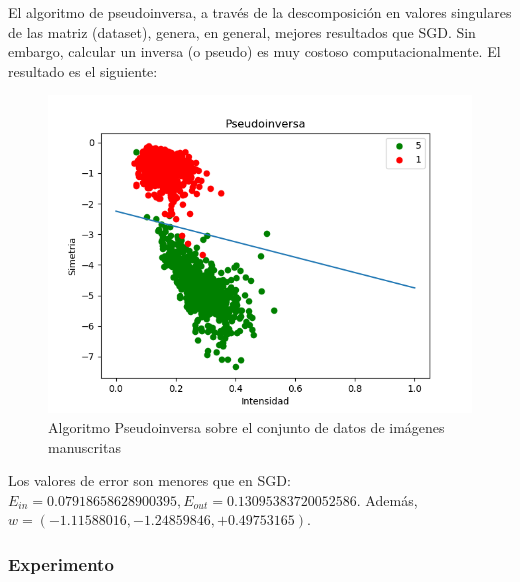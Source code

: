 El algoritmo de pseudoinversa, a través de la descomposición en valores singulares de las matriz (dataset), genera, en general, mejores resultados que SGD. Sin embargo, calcular un inversa (o pseudo) es muy costoso computacionalmente. El resultado es el siguiente:

\begin{figure}[H] %
	\centering
	\includegraphics[scale=0.6]{pseudoinversa.png}  %
	\caption{Algoritmo Pseudoinversa sobre el conjunto de datos de imágenes manuscritas} 
	\label{fig:pseud}
\end{figure}

Los valores de error son menores que en SGD: $E_{in}=0.07918658628900395, E_{out}=0.13095383720052586$. Además, $w=(-1.11588016,-1.24859846,+0.49753165)$.
\newpage

\subsubsection{Experimento}

